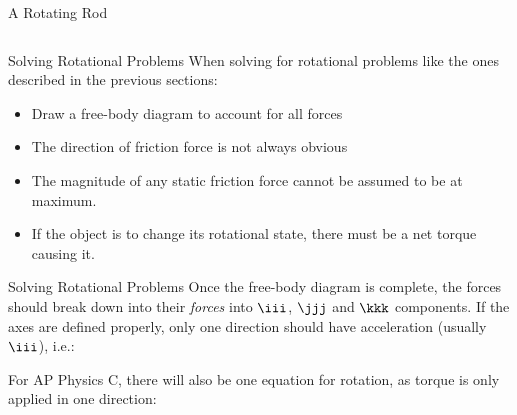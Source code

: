 \documentclass[12pt,compress,aspectratio=169]{beamer}
\begin{document}
\begin{frame}{A Rotating Rod}
  \begin{columns}
    \centering

  \end{columns}
\end{frame}


\begin{frame}{Solving Rotational Problems}
  When solving for rotational problems like the ones described in the previous
  sections:
  \begin{itemize}
  \item Draw a free-body diagram to account for all forces
  \item The direction of friction force is not always obvious
  \item The magnitude of any static friction force cannot be assumed to be at
    maximum.
  \item If the object is to change its rotational state, there must be a net
    torque causing it.
  \end{itemize}
\end{frame}



\begin{frame}{Solving Rotational Problems}
  Once the free-body diagram is complete, the forces should break down into
  their \emph{forces} into $\iii$, $\jjj$ and $\kkk$ components. If the axes
  are defined properly, only one direction should have acceleration (usually
  $\iii$), i.e.:
  

  For AP Physics C, there will also be one equation for rotation, as torque is
  only applied in one direction:
    
\end{frame}
\end{document}
